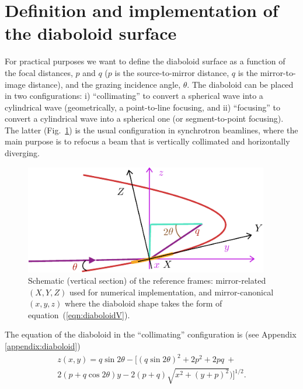 \documentclass{iucr}       %
\begin{document}
\section{Definition and implementation of the diaboloid surface}
\label{sec:DiaboloidEqs}

For practical purposes we want to define the diaboloid surface as a function of the focal distances, $p$ and $q$ ($p$ is the source-to-mirror distance, $q$ is the mirror-to-image distance), and the grazing incidence angle, $\theta$. The diaboloid can be placed in two configurations: i) ``collimating'' to convert a spherical wave into a cylindrical wave (geometrically, a point-to-line focusing, and ii) ``focusing'' to convert a cylindrical wave into a spherical one (or segment-to-point focusing). The latter (Fig.~\ref{fig:frame}) is the usual configuration in synchrotron beamlines, where the main purpose is to refocus a beam that is vertically collimated and horizontally diverging. 


\begin{figure}\label{fig:frame}
\includegraphics[width=0.95\textwidth]{figures/fig1.pdf}
%
\caption{Schematic (vertical section) of the reference frames: mirror-related $(X,Y,Z)$ used for numerical implementation, and mirror-canonical $(x,y,z)$ where the diaboloid shape takes the form of equation~(\ref{eqn:diaboloidV}). }
\end{figure}


The equation of the diaboloid in the ``collimating'' configuration is (see Appendix \ref{appendix:diaboloid})
\begin{multline}
\label{eqn:diaboloidV}
z(x,y) = q \sin2\theta - 
[ (q \sin{2\theta})^2 + 2p^2 + 2 p q~+\\
2 (p + q \cos{2\theta}) y - 2 (p+q) \sqrt{x^2 + (y + p)^2}) ]^{1/2}.
\end{multline}
\end{document}
